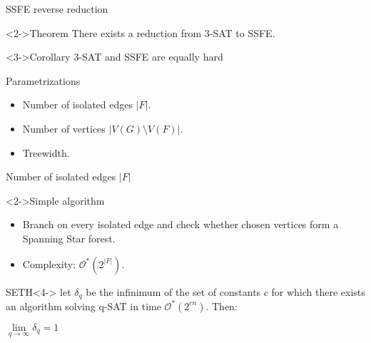 \documentclass{beamer}
\begin{document}
\begin{frame}{SSFE reverse reduction}
	\begin{block}<2->{Theorem}
		There exists a reduction from 3-SAT to SSFE.
	\end{block}

	\bigskip

	\begin{block}<3->{Corollary}
		3-SAT and SSFE are equally hard
	\end{block}
\end{frame}

\begin{frame}[t]{Parametrizations}
\begin{itemize}[<+(1)->]
	\item[] Number of isolated edges $|F|$.
	\bigskip
	\item[] Number of vertices $|V(G) \setminus V(F)|$.
	\bigskip
	\item[] Treewidth.
\end{itemize}
\end{frame}

\begin{frame}[t]{Number of isolated edges $|F|$}
	\begin{block}<2->{Simple algorithm}
		\setlength{\leftmargini}{2pt}
		\begin{itemize}[<+(1)->]
			\item[] Branch on every isolated edge and check whether chosen vertices form a Spanning Star forest.
			\item[] Complexity: $\mathcal{O}^*(2^{|F|})$.
		\end{itemize}
	\end{block}
	\bigskip
	\begin{block}{SETH}<4->
		let $\delta_q$ be the infinimum of the set of constants $c$ for which there exists an algorithm solving q-SAT in time $\mathcal{O}^*(2^{cn})$. Then:\bigskip
		\begin{center}
			$\lim\limits_{q \rightarrow \infty } \delta_q = 1$
		\end{center}
	\end{block}
	\onslide
\end{frame}
\end{document}
